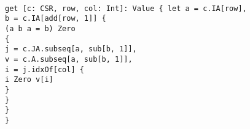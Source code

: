 \begin{myquote}\small{\texttt{\\
\Bfun get [c: CSR, row, col: Int]: Value \{
\TA let a = c.IA[row],\\
\TC b = c.IA[add[row, 1]] \{\\
\TB (\Bno a \Bor \Bno b \Bor a = b) \Bimplies Zero\\
\TB \Belse \{\\
\TC \Blet j = c.JA.subseq[a, sub[b, 1]],\\
\TE v = c.A.subseq[a, sub[b, 1]],\\
\TE i = j.idxOf[col] \{\\
\TD \Bno i \Bimplies Zero \Belse v[i]\\
\TC \}\\
\TB \}\\
\TA \}\\
\}
}}
\end{myquote}